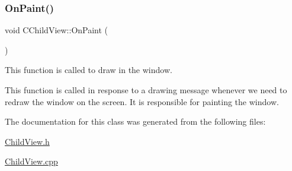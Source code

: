 \subsubsection{\texorpdfstring{On\+Paint()}{OnPaint()}}
{\footnotesize\ttfamily void C\+Child\+View\+::\+On\+Paint (\begin{DoxyParamCaption}{ }\end{DoxyParamCaption})\hspace{0.3cm}{\ttfamily [protected]}}

This function is called to draw in the window.

This function is called in response to a drawing message whenever we need to redraw the window on the screen. It is responsible for painting the window. 

The documentation for this class was generated from the following files\+:\begin{DoxyCompactItemize}
\item 
\mbox{\hyperlink{_child_view_8h}{Child\+View.\+h}}\item 
\mbox{\hyperlink{_child_view_8cpp}{Child\+View.\+cpp}}\end{DoxyCompactItemize}
